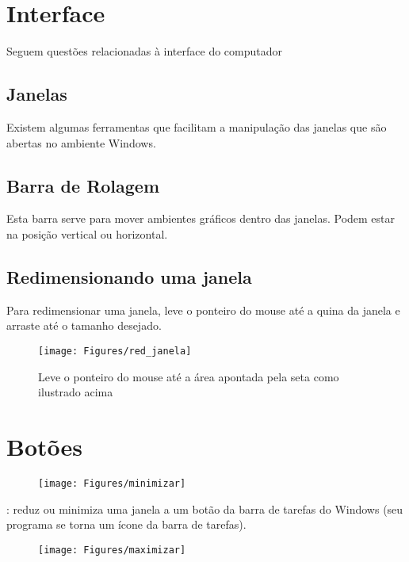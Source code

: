 \documentclass[12pt]{article}
\begin{document}
	\section{Interface}	
	Seguem questões relacionadas à interface do computador
	
	\subsection{Janelas}
	Existem algumas ferramentas que facilitam a manipulação das janelas que são abertas no ambiente Windows.
	
	\subsection{Barra de Rolagem}
	Esta barra serve para mover ambientes gráficos dentro das janelas. Podem estar na posição vertical ou horizontal.
	
	\subsection{Redimensionando uma janela}
	Para redimensionar uma janela, leve o ponteiro do mouse até a quina da janela e arraste até o tamanho desejado.
	
	\begin{figure}[!h]
		\centering
		\texttt{[image: Figures/red\_janela]}
		\caption{Leve o ponteiro do mouse até a área apontada pela seta como ilustrado acima}
		\label{fig:redimensionando janela}
		
	\end{figure}
	
	
	\section{Botões}
	
	
	\begin{figure}[!h]
			\texttt{[image: Figures/minimizar]}
			\label{fig:min }
	\end{figure}
	
	\vspace{-1cm}{\bf Botão Minimizar}: reduz ou minimiza uma janela a um botão da barra de tarefas do Windows (seu programa se torna um ícone da barra de tarefas).
	
	\begin{figure}[!h]
		\texttt{[image: Figures/maximizar]}
		\label{fig:max}
	\end{figure}
	
\end{document}
